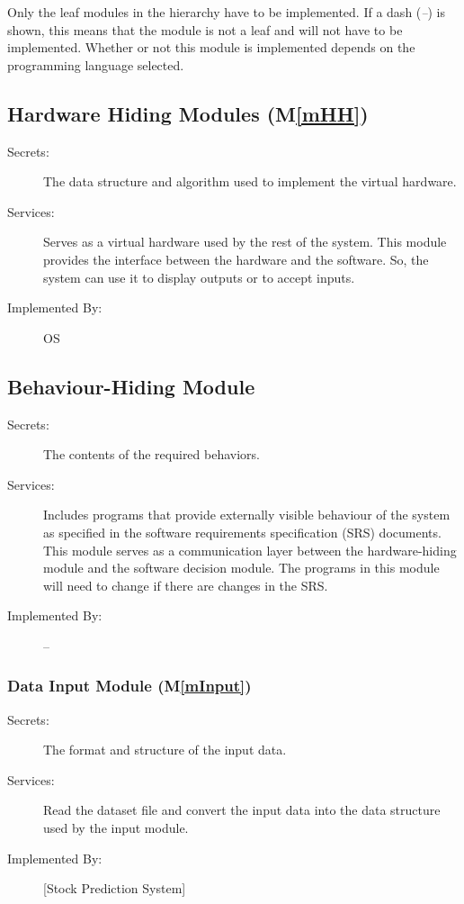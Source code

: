 \documentclass[12pt, titlepage]{article}
\newcommand{\mref}[1]{M\ref{#1}}
\begin{document}
Only the leaf modules in the
hierarchy have to be implemented. If a dash (\emph{--}) is shown, this means
that the module is not a leaf and will not have to be implemented. Whether or
not this module is implemented depends on the programming language
selected.

\subsection{Hardware Hiding Modules (\mref{mHH})}

\begin{description}
\item[Secrets:]The data structure and algorithm used to implement the virtual
hardware.
\item[Services:]Serves as a virtual hardware used by the rest of the
system. This module provides the interface between the hardware and the
software. So, the system can use it to display outputs or to accept inputs.
\item[Implemented By:] OS
\end{description}

\subsection{Behaviour-Hiding Module}

\begin{description}
\item[Secrets:]The contents of the required behaviors.
\item[Services:]Includes programs that provide externally visible behaviour of
the system as specified in the software requirements specification (SRS)
documents. This module serves as a communication layer between the
hardware-hiding module and the software decision module. The programs in this
module will need to change if there are changes in the SRS.
\item[Implemented By:] --
\end{description}

\subsubsection{Data Input Module (\mref{mInput})}

\begin{description}
\item[Secrets:]The format and structure of the input data.
\item[Services:]Read the dataset file and convert the input data into the data structure used by the
input module.
\item[Implemented By:] [Stock Prediction System]
\end{description}
\end{document}
